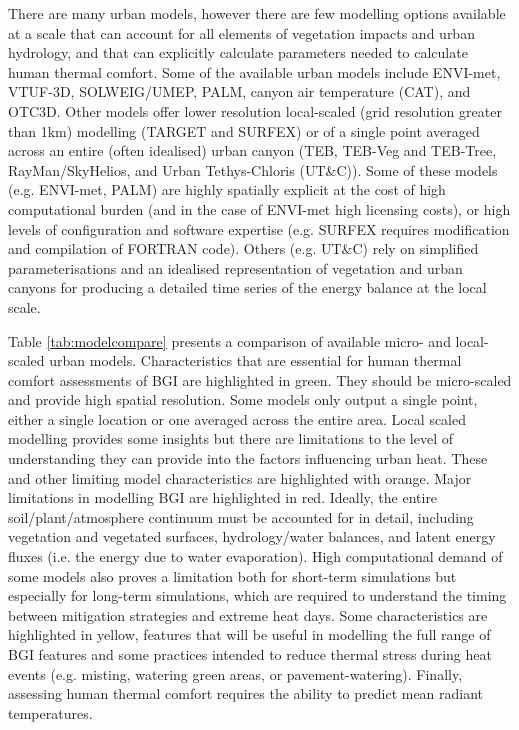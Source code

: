 There are many urban models, however there are few modelling options available at a scale that can account for all elements of vegetation impacts and urban hydrology, and that can explicitly calculate parameters needed to calculate human thermal comfort. Some of the available urban models include ENVI-met\cite{Bruse1999}, VTUF-3D\cite{Nice2018a}, SOLWEIG/UMEP\cite{Lindberg2018}, PALM\cite{Dominik2019}, canyon air temperature (CAT)\cite{Erell2006}, and OTC3D\cite{Nazarian2018}. Other models offer lower resolution local-scaled (grid resolution greater than 1km) modelling (TARGET\cite{Broadbent2019c} and SURFEX\cite{Masson2013}) or of a single point averaged across an entire (often idealised) urban canyon (TEB\cite{Masson2002a},  TEB-Veg and TEB-Tree\cite{Lemonsu2012,Redon2020}, RayMan\cite{Matzarakis2010}/SkyHelios\cite{Matzarakis2011}, and Urban Tethys-Chloris (UT\&C)\cite{Meili2020}). Some of these models (e.g. ENVI-met, PALM) are highly spatially explicit at the cost of high computational burden (and in the case of ENVI-met high licensing costs), or high levels of configuration and software expertise (e.g. SURFEX requires modification and compilation of FORTRAN code). Others (e.g. UT\&C) rely on simplified parameterisations and an idealised representation of vegetation and urban canyons for producing a detailed time series of the energy balance at the local scale. 

Table \ref{tab:modelcompare} presents a comparison of available micro- and local-scaled urban models. Characteristics that are essential for human thermal comfort assessments of BGI are highlighted in green. They should be micro-scaled and provide high spatial resolution. Some models only output a single point, either a single location or one averaged across the entire area.  Local scaled modelling provides some insights but there are limitations to the level of understanding they can provide into the factors influencing urban heat. These and other limiting model characteristics are highlighted with orange. Major limitations in modelling BGI are highlighted in red. Ideally, the entire soil/plant/atmosphere continuum must be accounted for in detail, including vegetation and vegetated surfaces, hydrology/water balances, and latent energy fluxes (i.e. the energy due to water evaporation). High computational demand of some models also proves a limitation both for short-term simulations but especially for long-term simulations, which are required to understand the timing between mitigation strategies and extreme heat days. Some characteristics are highlighted in yellow, features that will be useful in modelling the full range of BGI features and some practices intended to reduce thermal stress during heat events (e.g. misting, watering green areas, or pavement-watering). Finally, assessing human thermal comfort requires the ability to predict mean radiant temperatures.


